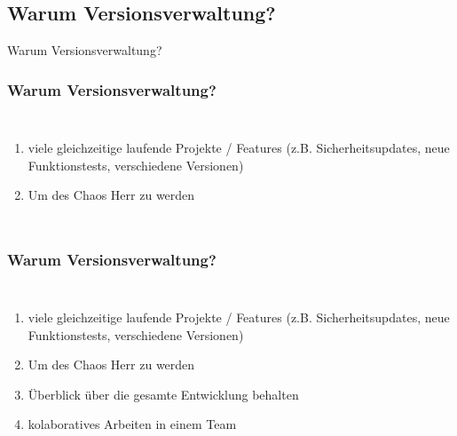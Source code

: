 \documentclass{beamer}
\begin{document}
\subsection{Warum Versionsverwaltung?}
\begin{frame}[c]
\begin{center}
\begin{Huge}
Warum Versionsverwaltung?
\end{Huge}
\end{center}
\end{frame}


\begin{frame}\frametitle{Warum Versionsverwaltung?}
\begin{columns}
                \begin{enumerate}
                \item viele gleichzeitige laufende Projekte / Features (z.B. Sicherheitsupdates, neue Funktionstests, verschiedene Versionen)
                \item Um des Chaos Herr zu werden
                \end{enumerate}
\end{columns}
\end{frame}

\begin{frame}\frametitle{Warum Versionsverwaltung?}
\begin{columns}
                \begin{enumerate}
                \item viele gleichzeitige laufende Projekte / Features (z.B. Sicherheitsupdates, neue  Funktionstests, verschiedene Versionen)
                \item Um des Chaos Herr zu werden
                \item Überblick über die gesamte Entwicklung behalten
                \item kolaboratives Arbeiten in einem Team
                \end{enumerate}
\end{columns}
\end{frame}

\end{document}
